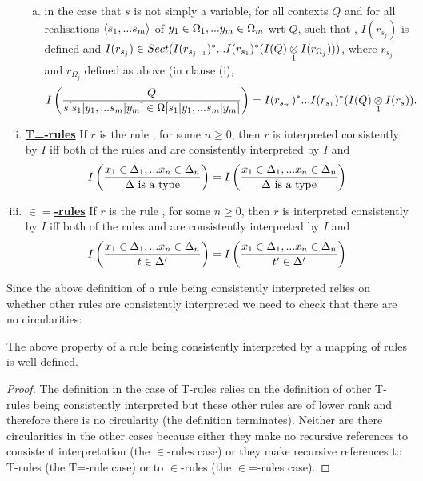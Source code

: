 \begin{definition}
\begin{enumerate}[(i)]
\begin{enumerate}[(a)]
\item in the case that $s$ is not simply a variable, 
for all contexts $Q$ and for all realisations $\tuple{\sm}$ of $\yOmega{m}$ wrt $Q$, 
such that \foreachj, $I(r_{s_j})$ is defined 
and $I(r_{s_j}) \in Sect(I(r_{s_{j-1}})^*...I(r_{s_1})^*(\crossx{I(Q)}{I(r_{\Omega_j})}{1}))$, 
where $r_{s_j}$ and $r_{\Omega_j}$ defined as above (in clause (i),
$$ \Imappedrule{Q}{\ofT{s[\SUBsFORy{m}]}{\Omega[\SUBsFORy{m}]}} = I(r_{s_m})^*...I(r_{s_1})^*(\crossx{I(Q)}{I(r_s)}{1}).$$
\end{enumerate}

\item \underline{\textbf{T=-rules}} 
If $r$ is the rule  , for some $n \geq 0$, 
then $r$ is interpreted consistently by $I$ iff
both of the rules \ZDelta and \ZDeltap
are consistently interpreted by $I$ and
$$
\Imappedrule{\xDelta{n}}{\isT{\Delta}} = \Imappedrule{\xDelta{n}}{\isT{\Delta}}
$$
 
\item \underline{\textbf{$\in=$-rules}} 
If $r$ is the rule  , for some $n \geq 0$, 
then $r$ is interpreted consistently by $I$ iff
both of the rules \ZtDelta and 
are consistently interpreted by $I$ and
$$
\Imappedrule{\xDelta{n}}{\ofT{t}{\Delta'}} = \Imappedrule{\xDelta{n}}{\ofT{t'}{\Delta'}}
$$
\end{enumerate}
\end{definition}

Since the above definition of a rule being consistently interpreted relies on whether other rules are consistently interpreted we need to check that there are no circularities:
\begin{lemma}
The above property of a rule being consistently interpreted by a mapping of rules is well-defined. 
\end{lemma}
\begin{proof}
The definition in the case of T-rules relies on the definition of other T-rules being consistently interpreted but these other rules are of lower rank and therefore there is no circularity 
(the definition terminates).
Neither are there circularities in the other cases because either they make no recursive references to consistent interpretation (the $\in$-rules case)
or they make recursive references to T-rules (the T=-rule case) or to $\in$-rules (the $\in$=-rules case).
\end{proof}

